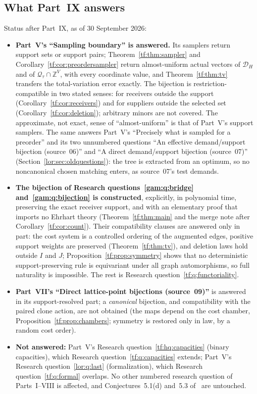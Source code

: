 \documentclass[11pt]{article}
\numberwithin{equation}{section}
\theoremstyle{definition}
\newcommand{\Z}{\mathbb Z}
\newcommand{\Qt}{\mathcal Q_\tau}
\newcommand{\cD}{\mathcal D}
\begin{document}
\subsection{What Part~IX answers}
\label{tf:sec:answers}
Status after Part~IX, as of 30 September 2026:
\begin{itemize}[leftmargin=1.4em]
\item \textbf{Part~V's ``Sampling boundary'' is answered.} Its samplers
return support sets or support pairs; Theorem~\ref{tf:thm:sampler} and
Corollary~\ref{tf:cor:preordersampler} return almost-uniform actual
vectors of $\cD_H$ and of $\Qt\cap\Z^V$, with every coordinate value, and
Theorem~\ref{tf:thm:tv} transfers the total-variation error exactly. The
bijection is restriction-compatible in two stated senses: for receivers
outside the support (Corollary~\ref{tf:cor:receivers}) and for suppliers
outside the selected set (Corollary~\ref{tf:cor:deletion}); arbitrary
minors are not covered. The approximate, not exact, sense of
``almost-uniform'' is that of Part~V's support samplers. The same answers
Part~V's ``Precisely what is sampled for a preorder'' and its two
unnumbered questions ``An effective demand/support bijection (source~06)''
and ``A direct demand/support bijection (source~07)''
(Section~\ref{lor:sec:oldquestions}): the tree is extracted from an
optimum, so no noncanonical chosen matching enters, as source~07's test
demands.
\item \textbf{The bijection of Research questions~\ref{gam:q:bridge}
and~\ref{gam:q:bijection} is constructed}, explicitly, in polynomial time,
preserving the exact receiver support, and with an elementary proof that
imports no Ehrhart theory (Theorem~\ref{tf:thm:main} and the merge note
after Corollary~\ref{tf:cor:count}). Their compatibility clauses are
answered only in part: the cost system is a controlled ordering of the
augmented edges, positive support weights are preserved
(Theorem~\ref{tf:thm:tv}), and deletion laws hold outside $I$ and $J$;
Proposition~\ref{tf:prop:symmetry} shows that no deterministic
support-preserving rule is equivariant under all graph automorphisms, so
full naturality is impossible. The rest is Research
question~\ref{tf:q:functoriality}.
\item \textbf{Part~VII's ``Direct lattice-point bijections
(source~09)''} is answered in its support-resolved part; a
\emph{canonical} bijection, and compatibility with the paired clone
action, are not obtained (the maps depend on the cost chamber,
Proposition~\ref{tf:prop:chambers}; symmetry is restored only in law, by
a random cost order).
\item \textbf{Not answered:} Part~V's Research
question~\ref{tf:hq:capacities} (binary capacities), which
Research question~\ref{tf:q:capacities} extends; Part~V's Research
question~\ref{lor:q:last} (formalization), which Research
question~\ref{tf:q:formal} overlaps. No other numbered research question
of Parts~I--VIII is affected, and Conjectures~5.1(d) and~5.3
of~\cite{AC} are untouched.
\end{itemize}
\end{document}
